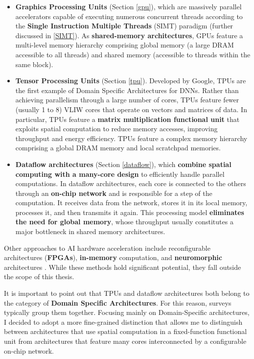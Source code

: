 \documentclass[conference]{IEEEtran}
\begin{document}
\begin{itemize}
    \item \textbf{Graphics Processing Units} (Section \ref{gpu}), which are massively parallel accelerators capable of executing numerous concurrent threads according to the \textbf{Single Instruction Multiple Threads} (SIMT) paradigm (further discussed in \ref{SIMT}). As \textbf{shared-memory architectures}, GPUs feature a multi-level memory hierarchy comprising global memory (a large DRAM accessible to all threads) and shared memory (accessible to threads within the same block).
    \item \textbf{Tensor Processing Units} (Section \ref{tpu}). Developed by Google, TPUs are the first example of Domain Specific Architectures for DNNs. Rather than achieving parallelism through a large number of cores, TPUs feature fewer (usually 1 to 8) VLIW cores that operate on vectors and matrices of data. In particular, TPUs feature a \textbf{matrix multiplication functional unit} that exploits spatial computation to reduce memory accesses, improving throughput and energy efficiency. TPUs feature a complex memory hierarchy comprising a global DRAM memory and local scratchpad memories.
    \item \textbf{Dataflow architectures} (Section \ref{dataflow}), which \textbf{combine spatial computing with a many-core design} to efficiently handle parallel computations. In dataflow architectures, each core is connected to the others through an \textbf{on-chip network} and is responsible for a step of the computation. It receives data from the network, stores it in its local memory, processes it, and then transmits it again. This processing model \textbf{eliminates the need for global memory}, whose throughput usually constitutes a major bottleneck in shared memory architectures.
\end{itemize}

Other approaches to AI hardware acceleration include reconfigurable architectures (\textbf{FPGAs}), \textbf{in-memory} computation, and \textbf{neuromorphic} architectures \cite{Kachris2025, Mohaidat2024, Hu2022}. While these methods hold significant potential, they fall outside the scope of this thesis.  

It is important to point out that TPUs and dataflow architectures both belong to the category of \textbf{Domain Specific Architectures}. For this reason, surveys typically group them together. Focusing mainly on Domain-Specific architectures, I decided to adopt a more fine-grained distinction that allows me to distinguish between architectures that use spatial computation in a fixed-function functional unit from architectures that feature many cores interconnected by a configurable on-chip network.
\end{document}
